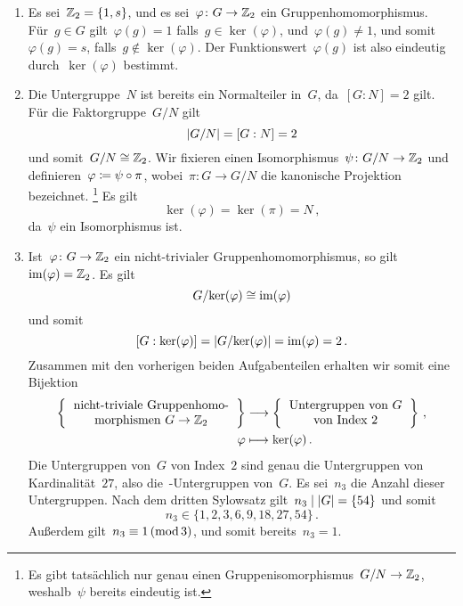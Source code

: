 \documentclass{scrartcl}
\begin{document}
\begin{solution}
  \begin{enumerate}
    \item
      Es sei~$\mathbb{Z}_2 = \{1, s\}$, und es sei~$\varphi \colon G \to \Integer_2$ ein Gruppenhomomorphismus.
      Für~$g \in G$ gilt~$\varphi(g) = 1$ falls~$g \in \ker(\varphi)$, und~$\varphi(g) \neq 1$, und somit~$\varphi(g) = s$, falls~$g \notin \ker(\varphi)$.
      Der Funktionswert~$\varphi(g)$ ist also eindeutig durch~$\ker(\varphi)$ bestimmt.
    \item
      Die Untergruppe~$N$ ist bereits ein Normalteiler in~$G$, da~$[G : N] = 2$ gilt.
      Für die Faktorgruppe~$G/N$ gilt
      \[
        \lvert G/N\rvert
        =
        [G : N]
        =
        2
      \]
      und somit~$G/N \cong \mathbb{Z}_2$.
      Wir fixieren einen Isomorphismus~$\psi \colon G/N \to \Integer_2$ und definieren~$\varphi \coloneqq \psi \circ \pi$, wobei~$\pi \colon G \to G/N$ die kanonische Projektion bezeichnet.%
      \footnote{
        Es gibt tatsächlich nur genau einen Gruppenisomorphismus~$G/N \to \Integer_2$, weshalb~$\psi$ bereits eindeutig ist.
      }
      Es gilt
      \[
        \ker(\varphi) = \ker(\pi) = N \,,
      \]
      da~$\psi$ ein Isomorphismus ist.
    \item
      Ist~$\varphi \colon G \to \Integer_2$ ein nicht-trivialer Gruppenhomomorphismus, so gilt~$\operatorname{im}(\varphi) = \mathbb{Z}_2$.
      Es gilt
      \[
        G / {\ker(\varphi)}
        \cong
        \operatorname{im}(\varphi)
      \]
      und somit
      \[
        [G : \ker(\varphi)]
        =
        \lvert G / {\ker(\varphi)} \rvert
        =
        { \operatorname{im}(\varphi) }
        =
        2 \,.
      \]
      Zusammen mit den vorherigen beiden Aufgabenteilen erhalten wir somit eine Bijektion
      \begin{align*}
        \left\{
          \begin{tabular}{c}
            nicht-triviale Gruppenhomo-\\
            morphismen~$G \to \Integer_2$
          \end{tabular}
       \right\}
        &\to
        \left\{
          \begin{tabular}{c}
            Untergruppen von~$G$\\
            von Index~$2$
          \end{tabular}
        \right\} \,,
        \\
        \varphi
        &\mapsto
        \ker(\varphi) \,.
      \end{align*}
      Die Untergruppen von~$G$ von Index~$2$ sind genau die Untergruppen von Kardinalität~$27$, also die~-Untergruppen von~$G$.
      Es sei~$n_3$ die Anzahl dieser Untergruppen.
      Nach dem dritten Sylowsatz gilt~$n_3 \mid \lvert G\rvert = \{ 54 \}$ und somit
      \[
        n_3 \in \{ 1, 2, 3, 6, 9, 18, 27, 54 \} \,.
      \]
      Außerdem gilt~$n_3 \equiv 1 \,(\operatorname{mod} 3)$, und somit bereits~$n_3 = 1$.


\end{enumerate}
\end{solution}
\end{document}
